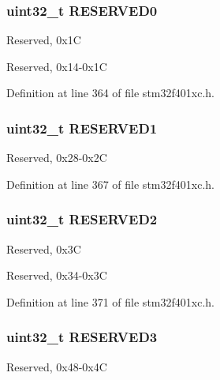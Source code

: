 \subsubsection[{\texorpdfstring{R\+E\+S\+E\+R\+V\+E\+D0}{RESERVED0}}]{\setlength{\rightskip}{0pt plus 5cm}uint32\+\_\+t R\+E\+S\+E\+R\+V\+E\+D0}\hypertarget{struct_r_c_c___type_def_af86c61a5d38a4fc9cef942a12744486b}{}\label{struct_r_c_c___type_def_af86c61a5d38a4fc9cef942a12744486b}
Reserved, 0x1C

Reserved, 0x14-\/0x1C 

Definition at line 364 of file stm32f401xc.\+h.

\subsubsection[{\texorpdfstring{R\+E\+S\+E\+R\+V\+E\+D1}{RESERVED1}}]{\setlength{\rightskip}{0pt plus 5cm}uint32\+\_\+t R\+E\+S\+E\+R\+V\+E\+D1}\hypertarget{struct_r_c_c___type_def_a3c50f8698052818ea3024b4b52d65886}{}\label{struct_r_c_c___type_def_a3c50f8698052818ea3024b4b52d65886}
Reserved, 0x28-\/0x2C 

Definition at line 367 of file stm32f401xc.\+h.

\subsubsection[{\texorpdfstring{R\+E\+S\+E\+R\+V\+E\+D2}{RESERVED2}}]{\setlength{\rightskip}{0pt plus 5cm}uint32\+\_\+t R\+E\+S\+E\+R\+V\+E\+D2}\hypertarget{struct_r_c_c___type_def_a4c9b972a304c0e08ca27cbe57627c496}{}\label{struct_r_c_c___type_def_a4c9b972a304c0e08ca27cbe57627c496}
Reserved, 0x3C

Reserved, 0x34-\/0x3C 

Definition at line 371 of file stm32f401xc.\+h.

\subsubsection[{\texorpdfstring{R\+E\+S\+E\+R\+V\+E\+D3}{RESERVED3}}]{\setlength{\rightskip}{0pt plus 5cm}uint32\+\_\+t R\+E\+S\+E\+R\+V\+E\+D3}\hypertarget{struct_r_c_c___type_def_a955c57c5240e03f2f51ab7d6d033f59d}{}\label{struct_r_c_c___type_def_a955c57c5240e03f2f51ab7d6d033f59d}
Reserved, 0x48-\/0x4C 

